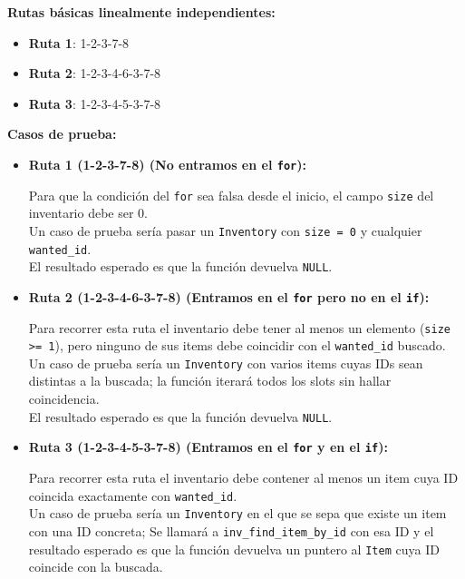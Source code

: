 \textbf{Rutas básicas linealmente independientes:} 

\begin{itemize}
	\item \textbf{Ruta 1}: 1-2-3-7-8
	\item \textbf{Ruta 2}: 1-2-3-4-6-3-7-8
	\item \textbf{Ruta 3}: 1-2-3-4-5-3-7-8
\end{itemize}

\bigskip

\textbf{Casos de prueba:}

\begin{itemize}
	\item \textbf{Ruta 1 (1-2-3-7-8) (No entramos en el \texttt{for}):}
		
		Para que la condición del \verb|for| sea falsa desde el inicio, 
		el campo \verb|size| del inventario debe ser 0.\\
		Un caso de prueba sería pasar un \verb|Inventory| con \verb|size = 0| 
		y cualquier \verb|wanted_id|.\\
		El resultado esperado es que la función devuelva \verb|NULL|.

	\item \textbf{Ruta 2 (1-2-3-4-6-3-7-8) (Entramos en el \texttt{for} pero no en el \texttt{if}):}

		Para recorrer esta ruta el inventario debe tener al menos un elemento 
		(\verb|size >= 1|), 
		pero ninguno de sus items debe coincidir con el \verb|wanted_id| buscado.\\
		Un caso de prueba sería un \verb|Inventory| con varios items cuyas IDs 
		sean distintas a la buscada; 
		la función iterará todos los slots sin hallar coincidencia.\\
		El resultado esperado es que la función devuelva \verb|NULL|.

	\item \textbf{Ruta 3 (1-2-3-4-5-3-7-8) (Entramos en el \texttt{for} y en el \texttt{if}):}

		Para recorrer esta ruta el inventario debe contener al menos un item 
		cuya ID coincida exactamente con \verb|wanted_id|.\\
		Un caso de prueba sería un \verb|Inventory| en el que se sepa que 
		existe un item con una ID concreta; 
		Se llamará a \verb|inv_find_item_by_id| con esa ID y
		el resultado esperado es que la función devuelva un puntero al 
		\verb|Item| cuya ID coincide con la buscada.
\end{itemize}

